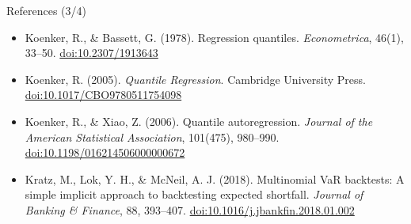 \begin{frame}{References (3/4)}
\begin{itemize}
    \item Koenker, R., \& Bassett, G. (1978). Regression quantiles. \textit{Econometrica}, 46(1), 33--50. \href{https://doi.org/10.2307/1913643}{doi:10.2307/1913643}
    \item Koenker, R. (2005). \textit{Quantile Regression}. Cambridge University Press. \href{https://doi.org/10.1017/CBO9780511754098}{doi:10.1017/CBO9780511754098}
    \item Koenker, R., \& Xiao, Z. (2006). Quantile autoregression. \textit{Journal of the American Statistical Association}, 101(475), 980--990. \href{https://doi.org/10.1198/016214506000000672}{doi:10.1198/016214506000000672}
    \item Kratz, M., Lok, Y. H., \& McNeil, A. J. (2018). Multinomial VaR backtests: A simple implicit approach to backtesting expected shortfall. \textit{Journal of Banking \& Finance}, 88, 393--407. \href{https://doi.org/10.1016/j.jbankfin.2018.01.002}{doi:10.1016/j.jbankfin.2018.01.002}
\end{itemize}
\end{frame}


